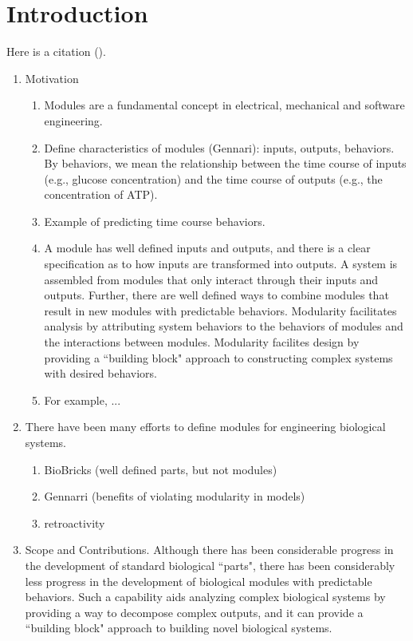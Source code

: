 \documentclass[unnumsec,webpdf,contemporary,large]{oup-authoring-template}%
\theoremstyle{thmstyleone}%
\theoremstyle{thmstyletwo}%
\theoremstyle{thmstylethree}%
\begin{document}
\maketitle


\section{Introduction}
Here is a citation (\cite{al2002handgrip}).
\begin{enumerate}

\item
Motivation
\begin{enumerate}
\item
Modules are a fundamental concept in electrical, mechanical and software engineering.
\item
Define characteristics of modules (Gennari): inputs, outputs, behaviors.
By behaviors, we mean the relationship between the time course
of inputs (e.g., glucose concentration) and the
time course of outputs (e.g., the
concentration of ATP).
\item
Example of predicting time course behaviors.
\item
A module has well defined inputs and outputs, and there is a clear specification as to how inputs are transformed into outputs. A system is assembled from modules that only interact through their inputs and outputs. Further, there are well defined ways to combine modules that result in new modules with predictable behaviors.
Modularity facilitates analysis by
attributing system behaviors to the behaviors of modules
and the interactions between modules.
Modularity facilites design by providing a ``building block" approach
to constructing complex systems with desired behaviors.
\item
For example, ...
\end{enumerate}
\item
There have been many efforts to define modules for engineering biological systems.
\begin{enumerate}
\item BioBricks (well defined parts, but not modules)
\item Gennarri (benefits of violating modularity in models)
\item retroactivity
\end{enumerate}
\item Scope and Contributions.
Although there has been considerable progress in the development of standard
biological ``parts", there has been considerably less progress in the
development of biological modules with predictable behaviors.
Such a capability aids analyzing complex
biological systems by providing a way to decompose complex outputs, and
it can provide a ``building block" approach to building novel biological systems.


\end{enumerate}
\end{document}
